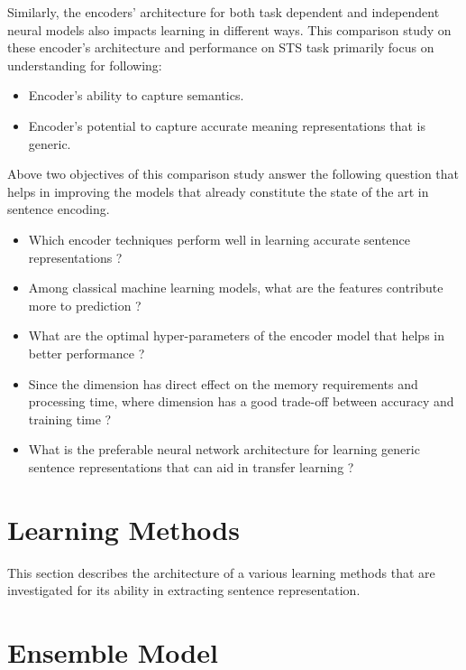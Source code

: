 \documentclass[12pt]{report} %
\begin{document}
 		
 Similarly, the encoders' architecture for both task dependent and independent neural models also impacts learning in different ways. This comparison study on these encoder's architecture and performance on STS task primarily focus on understanding for following:

\begin{itemize}
	\item Encoder's ability to capture semantics.
	\item Encoder's potential to capture accurate meaning representations that is generic.
\end{itemize}	

Above two objectives of this comparison study answer the following question that helps in improving the models that already constitute the state of the art in sentence encoding.

\begin{itemize}
	\item Which encoder techniques perform well in learning accurate sentence representations ?
	\item Among classical machine learning models, what are the features contribute more to prediction ?
	\item What are the optimal hyper-parameters of the encoder model that helps in better performance ?
	\item Since the dimension has direct effect on the memory requirements and processing time, where dimension has a good trade-off between accuracy and training time ?
	\item What is the preferable neural network architecture for learning generic sentence representations that can aid in transfer learning ?
\end{itemize}


 

\section*{Learning Methods}
This section describes the architecture of a various learning methods that are investigated for its ability in extracting sentence representation. 

\section{Ensemble Model}
\label{ensemble}
\end{document}
